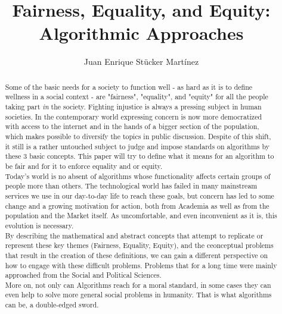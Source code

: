 \documentclass[acmlarge]{acmart}
\begin{document}
\title{Fairness, Equality, and Equity: Algorithmic Approaches}

\author{Juan Enrique Stücker Martínez}

%

\begin{abstract}
  Some of the basic needs for a society to function well - as hard as it is to define wellness in a social context - are "fairness", "equality", and "equity" for all the people taking part \textsl{in} the society. Fighting injustice is always a pressing subject in human societies. In the contemporary world expressing concern is now more democratized with access to the internet and in the hands of a bigger section of the population, which makes possible to diversify the topics in public discussion. Despite of this shift, it still is a rather untouched subject to judge and impose standards on algorithms by these 3 basic concepts. This paper will try to define what it means for an algorithm to be fair and for it to enforce equality and or equity. \\
  Today's world is no absent of algorithms whose functionality affects certain groups of people more than others. The technological world has failed in many mainstream services we use in our day-to-day life to reach these goals, but concern has led to some change and a growing motivation for action, both from Academia as well as from the population and the Market itself. As uncomfortable, and even inconvenient as it is, this evolution is necessary.\\
  By describing the mathematical and abstract concepts that attempt to replicate or represent these key themes (Fairness, Equality, Equity), and the ceonceptual problems that result in the creation of these definitions, we can gain a different perspective on how to engage with these difficult problems. Problems that for a long time were mainly approached from the Social and Political Sciences.\\
  More on, not only can Algorithms reach for a moral standard, in some cases they can even help to solve more general social problems in humanity.
  That is what algorithms can be, a double-edged sword.

\end{abstract}



\maketitle

\renewcommand{\shortauthors}{}

\graphicspath{{../figures/}}





\end{document}
